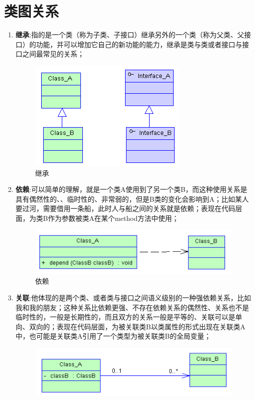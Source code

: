 \documentclass[UTF8,a4paper,12pt]{ctexbook}
\begin{document}
	\section{类图关系}
		\begin{enumerate}
			\item \textbf{继承}:指的是一个类（称为子类、子接口）继承另外的一个类（称为父类、父接口）的功能，并可以增加它自己的新功能的能力，继承是类与类或者接口与接口之间最常见的关系；
				\begin{figure}[h]
					\centering
					\includegraphics[scale = 0.7]{DeriveShip.jpg}
					\caption{继承}
				\end{figure}
			\item \textbf{依赖}:可以简单的理解，就是一个类A使用到了另一个类B，而这种使用关系是具有偶然性的、、临时性的、非常弱的，但是B类的变化会影响到A；比如某人要过河，需要借用一条船，此时人与船之间的关系就是依赖；表现在代码层面，为类B作为参数被类A在某个method方法中使用；
				\begin{figure}[h]
					\centering
					\includegraphics[scale = 0.7]{DependShip.jpg}
					\caption{依赖}
				\end{figure}
			\item \textbf{关联}:他体现的是两个类、或者类与接口之间语义级别的一种强依赖关系，比如我和我的朋友；这种关系比依赖更强、不存在依赖关系的偶然性、关系也不是临时性的，一般是长期性的，而且双方的关系一般是平等的、关联可以是单向、双向的；表现在代码层面，为被关联类B以类属性的形式出现在关联类A中，也可能是关联类A引用了一个类型为被关联类B的全局变量；
				\begin{figure}[h]
					\centering
					\includegraphics[scale = 0.7]{Association.jpg}

\end{figure}
\end{enumerate}
\end{document}
